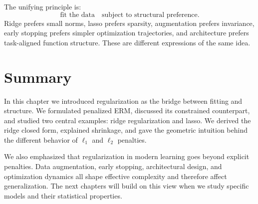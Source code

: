 The unifying principle is:
\[
\text{fit the data} \quad \text{subject to structural preference}.
\]
Ridge prefers small norms, lasso prefers sparsity, augmentation prefers invariance, early stopping prefers simpler optimization trajectories, and architecture prefers task-aligned function structure. These are different expressions of the same idea.

\section{Summary}

In this chapter we introduced regularization as the bridge between fitting and structure. We formulated penalized ERM, discussed its constrained counterpart, and studied two central examples: ridge regularization and lasso. We derived the ridge closed form, explained shrinkage, and gave the geometric intuition behind the different behavior of $\ell_1$ and $\ell_2$ penalties.

We also emphasized that regularization in modern learning goes beyond explicit penalties. Data augmentation, early stopping, architectural design, and optimization dynamics all shape effective complexity and therefore affect generalization. The next chapters will build on this view when we study specific models and their statistical properties.
